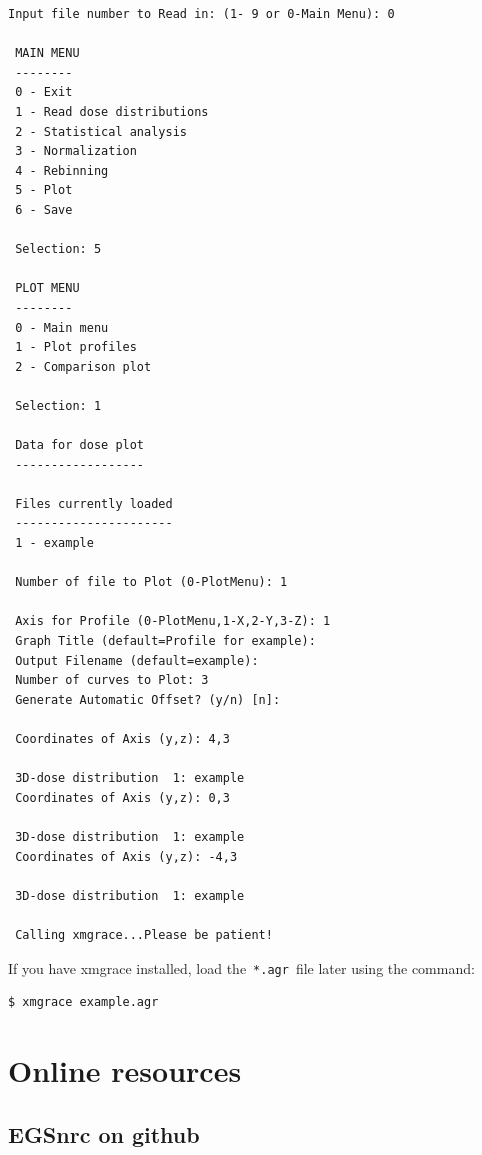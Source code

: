 \documentclass[12pt,twoside]{article}
\begin{document}
{\scriptsize
\begin{lstlisting}[language={},backgroundcolor=\color{white}]
 Input file number to Read in: (1- 9 or 0-Main Menu): 0

 MAIN MENU
 --------
 0 - Exit
 1 - Read dose distributions
 2 - Statistical analysis
 3 - Normalization
 4 - Rebinning
 5 - Plot
 6 - Save

 Selection: 5

 PLOT MENU
 --------
 0 - Main menu
 1 - Plot profiles
 2 - Comparison plot

 Selection: 1

 Data for dose plot
 ------------------

 Files currently loaded
 ----------------------
 1 - example

 Number of file to Plot (0-PlotMenu): 1

 Axis for Profile (0-PlotMenu,1-X,2-Y,3-Z): 1
 Graph Title (default=Profile for example):
 Output Filename (default=example):
 Number of curves to Plot: 3
 Generate Automatic Offset? (y/n) [n]:

 Coordinates of Axis (y,z): 4,3

 3D-dose distribution  1: example
 Coordinates of Axis (y,z): 0,3

 3D-dose distribution  1: example
 Coordinates of Axis (y,z): -4,3

 3D-dose distribution  1: example

 Calling xmgrace...Please be patient!
\end{lstlisting}
}

If you have xmgrace installed, load the \,\Verb|*.agr|\, file later using the command:

\begin{lstlisting}
$ xmgrace example.agr
\end{lstlisting}

\clearpage
\section{Online resources}

\subsection{EGSnrc on github}
\end{document}
